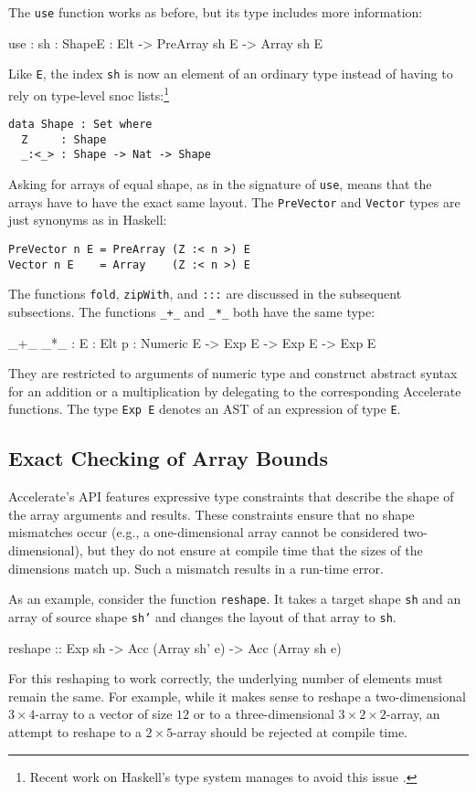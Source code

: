 \documentclass{llncs}
\begin{document}
The \texttt{use} function works as before, but its type
includes more information:
\begin{code}
use : {sh : Shape}{E : Elt} -> PreArray sh E -> Array sh E
\end{code}
Like \texttt{E}, the index \texttt{sh} is now an element of an
ordinary type instead of having to rely on type-level snoc
lists:\footnote{Recent work on Haskell's type system manages to avoid
  this issue \cite{YorgeyWeirichCretinJonesVytiniotisMagalhaes2012}.}
\begin{verbatim}
data Shape : Set where
  Z     : Shape
  _:<_> : Shape -> Nat -> Shape
\end{verbatim}
Asking for arrays of equal shape, as in the signature of \texttt{use},
means that the arrays have to have the exact same layout. The
\texttt{PreVector} and \texttt{Vector} types are just synonyms as in
Haskell:
\begin{verbatim}
PreVector n E = PreArray (Z :< n >) E
Vector n E    = Array    (Z :< n >) E
\end{verbatim}
The functions \texttt{fold}, \texttt{zipWith}, and \texttt{:::} are
discussed in the subsequent subsections. The functions \verb|_+_| and
\verb|_*_| both have the same type:
\begin{code}
_+_ _*_ : {E : Elt} {{p : Numeric E}} -> Exp E -> Exp E -> Exp E
\end{code}
They are restricted to arguments of numeric type and construct
abstract syntax for an addition or a multiplication by delegating to
the corresponding Accelerate functions. The type \texttt{Exp E}
denotes an AST of an expression of type \texttt{E}. 



\subsection{Exact Checking of Array Bounds}
\label{sec:exact-checking-array}

Accelerate's API features expressive type constraints that describe
the shape of the array arguments and results. These constraints ensure
that no shape mismatches occur (e.g., a one-dimensional array cannot be
considered two-dimensional), but they do not ensure at compile
time that the sizes of the dimensions match up. Such a mismatch
results in a run-time error.

As an example, consider the function \texttt{reshape}. 
It takes a target shape \texttt{sh} and an array of source shape
\texttt{sh'} and changes the layout of that array to \texttt{sh}. 
\begin{hcode}
reshape :: Exp sh -> Acc (Array sh' e) -> Acc (Array sh e)
\end{hcode}
For this reshaping to work correctly, the underlying
number of elements must remain the same. For example, while it makes sense
to reshape a two-dimensional $3\times 4$-array to a vector of size
$12$ or to a three-dimensional $3\times2\times2$-array, an attempt to
reshape to a $2\times5$-array should be rejected at
compile time.
\end{document}

